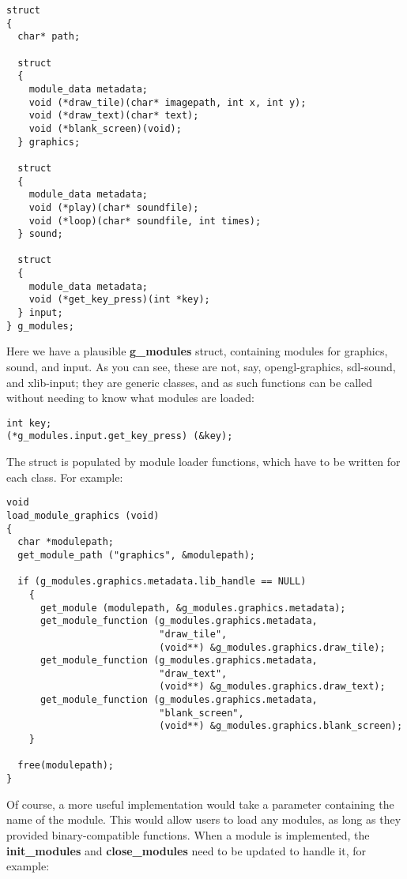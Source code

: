 \documentclass[12pt,a4paper]{article}
\begin{document}
\begin{lstlisting}
struct
{
  char* path;

  struct
  {
    module_data metadata;
    void (*draw_tile)(char* imagepath, int x, int y);
    void (*draw_text)(char* text);
    void (*blank_screen)(void);
  } graphics;

  struct
  {
    module_data metadata;
    void (*play)(char* soundfile);
    void (*loop)(char* soundfile, int times);
  } sound;

  struct
  {
    module_data metadata;
    void (*get_key_press)(int *key);
  } input;
} g_modules;
\end{lstlisting}

Here we have a plausible \textbf{g\_modules} struct, containing modules for graphics, sound, and input. As you can see, these are not, say, opengl-graphics, sdl-sound, and xlib-input; they are generic classes, and as such functions can be called without needing to know what modules are loaded:

\begin{lstlisting}
int key;
(*g_modules.input.get_key_press) (&key);
\end{lstlisting}

The struct is populated by module loader functions, which have to be written for each class. For example:

\begin{lstlisting}
void
load_module_graphics (void)
{
  char *modulepath;
  get_module_path ("graphics", &modulepath);

  if (g_modules.graphics.metadata.lib_handle == NULL)
    {
      get_module (modulepath, &g_modules.graphics.metadata);
      get_module_function (g_modules.graphics.metadata,
                           "draw_tile",
                           (void**) &g_modules.graphics.draw_tile);
      get_module_function (g_modules.graphics.metadata,
                           "draw_text",
                           (void**) &g_modules.graphics.draw_text);
      get_module_function (g_modules.graphics.metadata,
                           "blank_screen",
                           (void**) &g_modules.graphics.blank_screen);
    }

  free(modulepath);
}
\end{lstlisting}

Of course, a more useful implementation would take a parameter containing the name of the module. This would allow users to load any modules, as long as they provided binary-compatible functions. When a module is implemented, the \textbf{init\_modules} and \textbf{close\_modules} need to be updated to handle it, for example:
\end{document}
